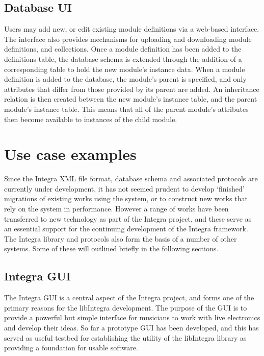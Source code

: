 \documentclass[10pt,journal,final]{IEEEtran}
\begin{document}
\subsection{Database UI}\label{subsec:db_ui}
Users may add new, or edit existing module definitions via a web-based interface. The interface also provides mechanisms for uploading and downloading module definitions, and collections.
Once a module definition has been added to the definitions table, the database schema is extended through the addition of a corresponding table to hold the new module's instance data. When a module definition is added to the database, the module's parent is specified, and only attributes that differ from those provided by its parent are added. An inheritance relation is then created between the new module's instance table, and the parent module's instance table. This means that all of the parent module's attributes then become available to instances of the child module.

\section{Use case examples}\label{sec:use_case}
Since the Integra XML file format, database schema and associated protocols are currently under development, it has not seemed prudent to develop `finished' migrations of existing works using the system, or to construct new works that rely on the system in performance. However a range of works have been transferred to new technology as part of the Integra project, and these serve as an essential support for the continuing development of the Integra framework. The Integra library and protocols also form the basis of a number of other systems. Some of these will outlined briefly in the following sections.

\subsection{Integra GUI}\label{sec:integra_gui}
The Integra GUI is a central aspect of the Integra project, and forms one of the primary reasons for the libIntegra development. The purpose of the GUI is to provide a powerful but simple interface for musicians to work with live electronics and develop their ideas. So far a prototype GUI has been developed, and this has served as useful testbed for establishing the utility of the libIntegra library as providing a foundation for usable software.
\end{document}
